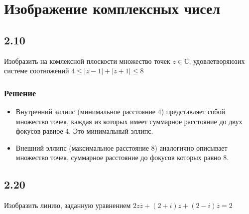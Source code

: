 \documentclass[12pt,a4paper]{article}
\begin{document}
\section{Изображение комплексных чисел}
\subsection*{2.10}
Изобразить на комлексной плоскости множество точек $z \in \mathbb{C}$, удовлетворяюзих системе соотножений $4 \leq |z-1|+|z+1| \leq 8$
\subsubsection*{Решение}
\begin{itemize}
\item Внутренний эллипс (минимальное расстояние 4) представляет собой множество точек, каждая из которых имеет суммарное расстояние до двух фокусов равное 4. Это минимальный эллипс.
\item Внешний эллипс (максимальное расстояние 8) аналогично описывает множество точек, суммарное расстояние до фокусов которых равно 8.
\end{itemize}

\begin{center}
\end{center}


\subsection*{2.20}
Изобразить линию, заданную уравнением $2z\overline{z}+(2+i)z+(2-i)\overline{z}=2$
\end{document}
